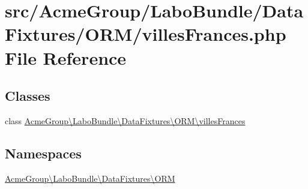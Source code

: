 \hypertarget{villes_frances_8php}{\section{src/\+Acme\+Group/\+Labo\+Bundle/\+Data\+Fixtures/\+O\+R\+M/villes\+Frances.php File Reference}
\label{villes_frances_8php}
}
\subsection*{Classes}
\begin{DoxyCompactItemize}
\item 
class \hyperlink{class_acme_group_1_1_labo_bundle_1_1_data_fixtures_1_1_o_r_m_1_1villes_frances}{Acme\+Group\textbackslash{}\+Labo\+Bundle\textbackslash{}\+Data\+Fixtures\textbackslash{}\+O\+R\+M\textbackslash{}villes\+Frances}
\end{DoxyCompactItemize}
\subsection*{Namespaces}
\begin{DoxyCompactItemize}
\item 
 \hyperlink{namespace_acme_group_1_1_labo_bundle_1_1_data_fixtures_1_1_o_r_m}{Acme\+Group\textbackslash{}\+Labo\+Bundle\textbackslash{}\+Data\+Fixtures\textbackslash{}\+O\+R\+M}
\end{DoxyCompactItemize}
